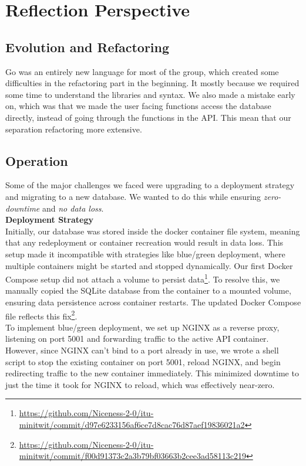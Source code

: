 \section{Reflection Perspective}
\subsection{Evolution and Refactoring}

Go was an entirely new language for most of the group, which created some difficulties in the refactoring part in the beginning. It mostly because we required some time to understand the libraries and syntax. 
We also made a mistake early on, which was that we made the user facing functions access the database directly, instead of going through the functions in the API. This mean that our separation refactoring more extensive.


\subsection{Operation}
Some of the major challenges we faced were upgrading to a deployment strategy and migrating to a new database. We wanted to do this while ensuring \textit{zero-downtime} and \textit{no data loss}.
\\

\noindent \textbf{Deployment Strategy}
\\

Initially, our database was stored inside the docker container file system, meaning that any redeployment or container recreation would result in data loss. This setup made it incompatible with strategies like blue/green deployment, where multiple containers might be started and stopped dynamically. Our first Docker Compose setup did not attach a volume to persist data\footnote{\url{https://github.com/Niceness-2-0/itu-minitwit/commit/d97e6233156af6ce7d8cac76d87aef19836021a2}}. To resolve this, we manually copied the SQLite database from the container to a mounted volume, ensuring data persistence across container restarts. The updated Docker Compose file reflects this fix\footnote{\url{https://github.com/Niceness-2-0/itu-minitwit/commit/f00d91373c2a3b79bf03663b2cee3ad58113c219}}.
\\

To implement blue/green deployment, we set up NGINX as a reverse proxy, listening on port 5001 and forwarding traffic to the active API container. However, since NGINX can't bind to a port already in use, we wrote a shell script to stop the existing container on port 5001, reload NGINX, and begin redirecting traffic to the new container immediately. This minimized downtime to just the time it took for NGINX to reload, which was effectively near-zero.
\\

